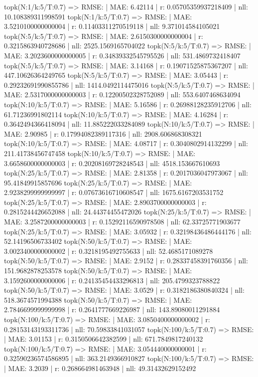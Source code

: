 topk(N:1/k:5/T:0.7) => RMSE: | MAE: 6.42114 | r: 0.05705359937218409 | nll: 10.108389311998591
topk(N:1/k:5/T:0.7) => RMSE: | MAE: 3.5210100000000004 | r: 0.11403311270519118 | nll: 9.371014584105021
topk(N:5/k:5/T:0.7) => RMSE: | MAE: 2.6150300000000004 | r: 0.3215863940728686 | nll: 2525.1569165704022
topk(N:5/k:5/T:0.7) => RMSE: | MAE: 3.2023600000000005 | r: 0.34839332545795526 | nll: 531.4869732418407
topk(N:5/k:5/T:0.7) => RMSE: | MAE: 3.14168 | r: 0.19071525875367207 | nll: 447.10626364249765
topk(N:5/k:5/T:0.7) => RMSE: | MAE: 3.05443 | r: 0.29232691990855786 | nll: 1414.0492114475016
topk(N:5/k:5/T:0.7) => RMSE: | MAE: 2.5317000000000003 | r: 0.12200502328752089 | nll: 553.6407468634094
topk(N:10/k:5/T:0.7) => RMSE: | MAE: 5.16586 | r: 0.26988128235912706 | nll: 61.71236991802114
topk(N:10/k:5/T:0.7) => RMSE: | MAE: 4.16284 | r: 0.3642494366418094 | nll: 11.885222033284089
topk(N:10/k:5/T:0.7) => RMSE: | MAE: 2.90985 | r: 0.17994082389117316 | nll: 2908.606868308321
topk(N:10/k:5/T:0.7) => RMSE: | MAE: 4.08717 | r: 0.3040802914132299 | nll: 211.41738456747458
topk(N:10/k:5/T:0.7) => RMSE: | MAE: 3.6658600000000003 | r: 0.20208169728248543 | nll: 4518.153667610693
topk(N:25/k:5/T:0.7) => RMSE: | MAE: 2.81358 | r: 0.2017036047973067 | nll: 95.41849915857696
topk(N:25/k:5/T:0.7) => RMSE: | MAE: 2.9238299999999997 | r: 0.07673616710608547 | nll: 1675.6167203531752
topk(N:25/k:5/T:0.7) => RMSE: | MAE: 2.8903700000000003 | r: 0.2815244426652088 | nll: 24.44374455472026
topk(N:25/k:5/T:0.7) => RMSE: | MAE: 3.2587200000000003 | r: 0.15292116590978508 | nll: 62.33725771903677
topk(N:25/k:5/T:0.7) => RMSE: | MAE: 3.05932 | r: 0.32198436486444176 | nll: 52.14196506733402
topk(N:50/k:5/T:0.7) => RMSE: | MAE: 3.0023400000000002 | r: 0.3218195492755633 | nll: 52.4685171089278
topk(N:50/k:5/T:0.7) => RMSE: | MAE: 2.9152 | r: 0.28337458391760356 | nll: 151.9682878253578
topk(N:50/k:5/T:0.7) => RMSE: | MAE: 3.1592600000000006 | r: 0.24135454433296813 | nll: 205.4799323788822
topk(N:50/k:5/T:0.7) => RMSE: | MAE: 3.0529 | r: 0.3182186380840324 | nll: 518.3674571994388
topk(N:50/k:5/T:0.7) => RMSE: | MAE: 2.7846699999999998 | r: 0.2641777669226987 | nll: 143.89080011291884
topk(N:100/k:5/T:0.7) => RMSE: | MAE: 3.0850400000000002 | r: 0.28153143193311736 | nll: 70.59833841031057
topk(N:100/k:5/T:0.7) => RMSE: | MAE: 3.01153 | r: 0.3150506642382599 | nll: 671.7849817240132
topk(N:100/k:5/T:0.7) => RMSE: | MAE: 3.054440000000001 | r: 0.32590236574586895 | nll: 363.2149366910827
topk(N:100/k:5/T:0.7) => RMSE: | MAE: 3.2039 | r: 0.268664981463948 | nll: 49.31432629152492
